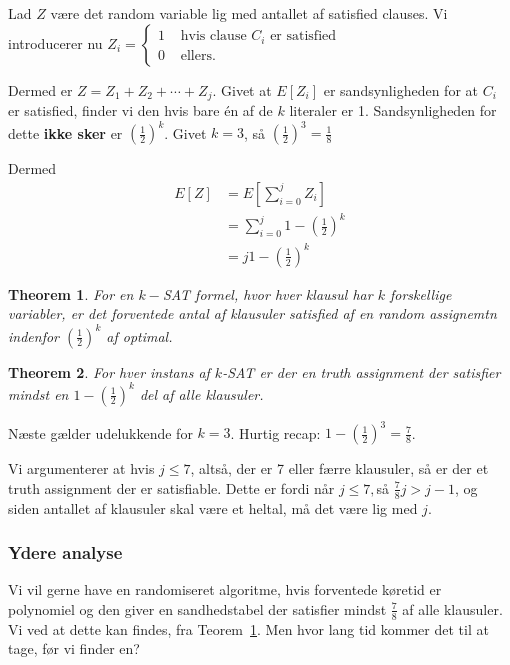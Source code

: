 \documentclass[11pt]{article}
\newtheorem{theorem}{Theorem}
\theoremstyle{definition}
\theoremstyle{remark}
\begin{document}
Lad $Z$ være det random variable lig med antallet af satisfied clauses. Vi introducerer nu $Z_{i} = \begin{cases}
  1 & \text{ hvis clause }C_{i} \text{ er satisfied}\\
  0 & \text{ ellers}.
\end{cases}$

Dermed er $Z = Z_{1} + Z_{2} + \cdots + Z_{j}$. Givet at $E[Z_{i}]$ er sandsynligheden for at $C_{i}$ er satisfied, finder vi den hvis bare én af de $k$ literaler er 1. Sandsynligheden for dette \textbf{ikke sker} er $\left( \frac{1}{2} \right)^{k}$. Givet $k = 3$, så $\left( \frac{1}{2} \right)^{3} = \frac{1}{8}$

Dermed
\begin{equation}
\begin{split}
  E[Z] &=E[ \sum_{i=0}^{j} Z_{i} ]\\
       &= \sum_{i=0}^{j} 1-\left( \frac{1}{2} \right) ^{k}\\
  &= j 1-\left( \frac{1}{2} \right)^{k}
\end{split}
\end{equation}

\begin{theorem}
  \label{theorem:13.15}
For en $k-$SAT formel, hvor hver klausul har $k$ forskellige variabler, er det forventede antal af klausuler satisfied af en random assignemtn indenfor $(\frac{1}{2})^{k}$ af optimal.
\end{theorem}


\begin{theorem}
For hver instans af $k$-SAT er der en truth assignment der satisfier mindst en $1 - \left ( \frac{1}{2} \right )^{k}$ del af alle klausuler.
\end{theorem}

Næste gælder udelukkende for $k = 3$. Hurtig recap: $1 - \left( \frac{1}{2} \right)^{3} = \frac{7}{8}$.

Vi argumenterer at hvis $j \leq 7$, altså, der er 7 eller færre klausuler, så er der et truth assignment der er satisfiable. Dette er fordi når $j \leq 7, $så $\frac{7}{8}j > j - 1$, og siden antallet af klausuler skal være et heltal, må det være lig med $j$.

\subsubsection{Ydere analyse}

Vi vil gerne have en randomiseret algoritme, hvis forventede køretid er polynomiel og den giver en sandhedstabel der satisfier mindst $\frac{7}{8}$ af alle klausuler.
Vi ved at dette kan findes, fra Teorem~\ref{theorem:13.15}. Men hvor lang tid kommer det til at tage, før vi finder en? 
\end{document}
